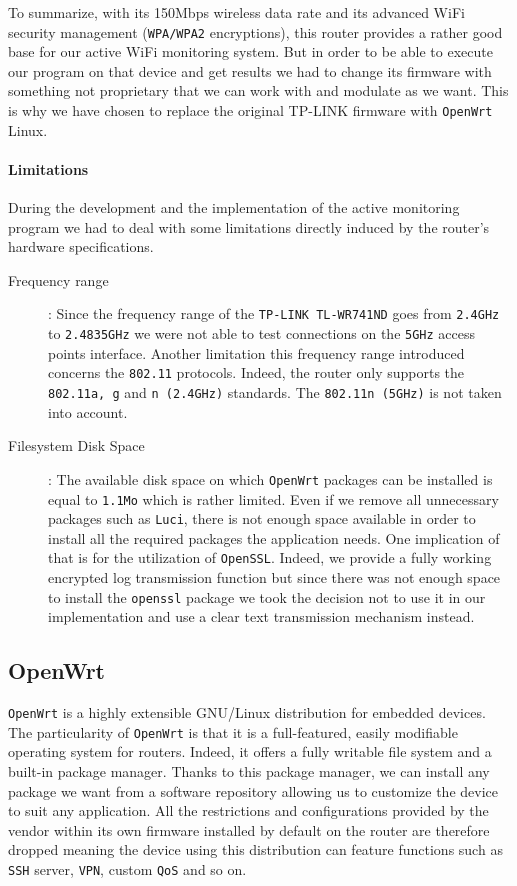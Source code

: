 To summarize, with its 150Mbps wireless data rate and its advanced WiFi security management (\texttt{WPA/WPA2} encryptions), this router provides a rather good base for our active WiFi monitoring system. But in order to be able to execute our program on that device and get results we had to change its firmware with something not proprietary that we can work with and modulate as we want. This is why we have chosen to replace the original TP-LINK firmware with \texttt{OpenWrt} Linux.

\paragraph*{Limitations}
During the development and the implementation of the active monitoring program we had to deal with some limitations directly induced by the router's hardware specifications.
\begin{description}
	\item [Frequency range]: Since the frequency range of the \texttt{TP-LINK TL-WR741ND} goes from \texttt{2.4GHz} to \texttt{2.4835GHz} we were not able to test connections on the \texttt{5GHz} access points interface. Another limitation this frequency range introduced concerns the \texttt{802.11} protocols. Indeed, the router only supports the \texttt{802.11a, g} and \texttt{n (2.4GHz)} standards. The \texttt{802.11n (5GHz)} is not taken into account.

	\item [Filesystem Disk Space]: The available disk space on which \texttt{OpenWrt} packages can be installed is equal to \texttt{1.1Mo} which is rather limited. Even if we remove all unnecessary packages such as \texttt{Luci}, there is not enough space available in order to install all the required packages the application needs. One implication of that is for the utilization of \texttt{OpenSSL}. Indeed, we provide a fully working encrypted log transmission function but since there was not enough space to install the \texttt{openssl} package we took the decision not to use it in our implementation and use a clear text transmission mechanism instead.
\end{description}

\subsection{OpenWrt}
\texttt{OpenWrt} \cite{openwrt} is a highly extensible GNU/Linux distribution for embedded devices. The particularity of \texttt{OpenWrt} is that it is a full-featured, easily modifiable operating system for routers. Indeed, it offers a fully writable file system and a built-in package manager. Thanks to this package manager, we can install any package we want from a software repository allowing us to customize the device to suit any application. All the restrictions and configurations provided by the vendor within its own firmware installed by default on the router are therefore dropped meaning the device using this distribution can feature functions such as \texttt{SSH} server, \texttt{VPN}, custom \texttt{QoS} and so on.

